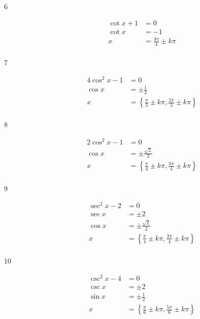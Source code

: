 \documentclass{exam}
\begin{document}
\begin{description}
      \item[6] 
        \begin{align*}
          \cot x + 1 & = 0 \\
          \cot x     & = -1 \\
          x          & = \boxed{ \frac{3 \pi}{4} \pm k \pi } \\
        \end{align*}

      \item[7] 
        \begin{align*}
          4 \cos^2 x - 1 & = 0 \\
          \cos x         & = \pm \frac{1}{2} \\
          x              & = \boxed{ \left\{ \frac{\pi}{3} \pm k \pi, \frac{2 \pi}{3} \pm k \pi \right\} } \\
        \end{align*}

      \item[8] 
        \begin{align*}
          2 \cos^2 x - 1 & = 0 \\
          \cos x         & = \pm \frac{\sqrt{2}}{2} \\
          x              & = \boxed{ \left\{ \frac{\pi}{4} \pm k \pi, \frac{3 \pi}{4} \pm k \pi \right\} } \\
        \end{align*}

      \item[9] 
        \begin{align*}
          \sec^2 x - 2 & = 0 \\
          \sec x         & = \pm 2 \\
          \cos x         & = \pm \frac{\sqrt{2}}{2} \\
          x              & = \boxed{ \left\{ \frac{\pi}{4} \pm k \pi, \frac{3 \pi}{4} \pm k \pi \right\} } \\
        \end{align*}

      \item[10] 
        \begin{align*}
          \csc^2 x - 4 & = 0 \\
          \csc x         & = \pm 2 \\
          \sin x         & = \pm \frac{1}{2} \\
          x              & = \boxed{ \left\{ \frac{\pi}{6} \pm k \pi, \frac{5 \pi}{6} \pm k \pi \right\} } \\
        \end{align*}


\end{description}
\end{document}
